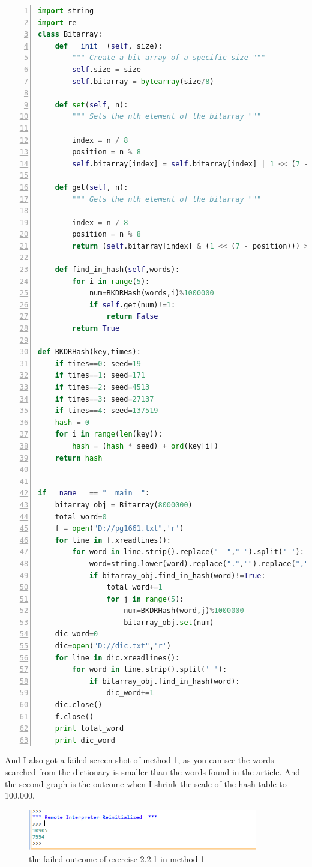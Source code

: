 \documentclass{article}
\begin{document}
\begin{lstlisting}[language=python,numbers=left,frame=leftline]
import string
import re
class Bitarray:
    def __init__(self, size):
        """ Create a bit array of a specific size """
        self.size = size
        self.bitarray = bytearray(size/8)

    def set(self, n):
        """ Sets the nth element of the bitarray """

        index = n / 8
        position = n % 8
        self.bitarray[index] = self.bitarray[index] | 1 << (7 - position)

    def get(self, n):
        """ Gets the nth element of the bitarray """

        index = n / 8
        position = n % 8
        return (self.bitarray[index] & (1 << (7 - position))) > 0

    def find_in_hash(self,words):
        for i in range(5):
            num=BKDRHash(words,i)%1000000
            if self.get(num)!=1:
                return False
        return True

def BKDRHash(key,times):
    if times==0: seed=19
    if times==1: seed=171
    if times==2: seed=4513
    if times==3: seed=27137
    if times==4: seed=137519
    hash = 0
    for i in range(len(key)):
        hash = (hash * seed) + ord(key[i])
    return hash


if __name__ == "__main__":
    bitarray_obj = Bitarray(8000000)
    total_word=0
    f = open("D://pg1661.txt",'r')
    for line in f.xreadlines():
        for word in line.strip().replace("--"," ").split(' '):
            word=string.lower(word).replace(".","").replace(",","")
            if bitarray_obj.find_in_hash(word)!=True:
                total_word+=1
                for j in range(5):
                    num=BKDRHash(word,j)%1000000
                    bitarray_obj.set(num)
    dic_word=0
    dic=open("D://dic.txt",'r')
    for line in dic.xreadlines():
        for word in line.strip().split(' '):
            if bitarray_obj.find_in_hash(word):
                dic_word+=1
    dic.close()
    f.close()
    print total_word
    print dic_word
\end{lstlisting}
And I also got a failed screen shot of method 1, as you can see the words searched from the dictionary is smaller than the words found in the article. And the second graph is the outcome when I shrink the scale of the hash table to 100,000.\\
\begin{figure}[htbp]
\centering
\includegraphics[width=10cm]{6.png}
\caption{the failed outcome of exercise 2.2.1 in method 1}
\end{figure}
\end{document}
